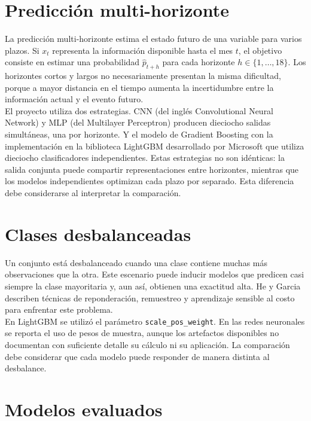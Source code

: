 \section{Predicción multi-horizonte}

La predicción multi-horizonte estima el estado futuro de una variable para varios plazos. Si $x_t$ representa la información disponible hasta el mes $t$, el objetivo consiste en estimar una probabilidad $\hat{p}_{t+h}$ para cada horizonte $h \in \{1, \ldots, 18\}$. Los horizontes cortos y largos no necesariamente presentan la misma dificultad, porque a mayor distancia en el tiempo aumenta la incertidumbre entre la información actual y el evento futuro.\\

El proyecto utiliza dos estrategias. CNN (del inglés Convolutional Neural Network) y MLP (del Multilayer Perceptron) producen dieciocho salidas simultáneas, una por horizonte. Y el modelo de Gradient Boosting con la implementación en la biblioteca LightGBM desarrollado por Microsoft que utiliza dieciocho clasificadores independientes. Estas estrategias no son idénticas: la salida conjunta puede compartir representaciones entre horizontes, mientras que los modelos independientes optimizan cada plazo por separado. Esta diferencia debe considerarse al interpretar la comparación.

\section{Clases desbalanceadas}

Un conjunto está desbalanceado cuando una clase contiene muchas más observaciones que la otra. Este escenario puede inducir modelos que predicen casi siempre la clase mayoritaria y, aun así, obtienen una exactitud alta. He y Garcia \cite{he2009learning} describen técnicas de reponderación, remuestreo y aprendizaje sensible al costo para enfrentar este problema.\\

En LightGBM se utilizó el parámetro \texttt{scale\_pos\_weight}. En las redes neuronales se reporta el uso de pesos de muestra, aunque los artefactos disponibles no documentan con suficiente detalle su cálculo ni su aplicación. La comparación debe considerar que cada modelo puede responder de manera distinta al desbalance.

\section{Modelos evaluados}

